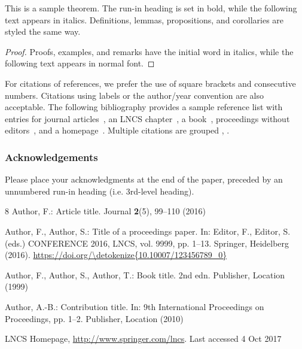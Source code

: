 \documentclass[runningheads]{llncs}
\def\doi#1{\href{https://doi.org/\detokenize{#1}}{\url{https://doi.org/\detokenize{#1}}}}
\begin{document}
\begin{theorem}
This is a sample theorem. The run-in heading is set in bold, while
the following text appears in italics. Definitions, lemmas,
propositions, and corollaries are styled the same way.
\end{theorem}
%
%
\begin{proof}
Proofs, examples, and remarks have the initial word in italics,
while the following text appears in normal font.
\end{proof}
For citations of references, we prefer the use of square brackets
and consecutive numbers. Citations using labels or the author/year
convention are also acceptable. The following bibliography provides
a sample reference list with entries for journal
articles~\cite{ref_article1}, an LNCS chapter~\cite{ref_lncs1}, a
book~\cite{ref_book1}, proceedings without editors~\cite{ref_proc1},
and a homepage~\cite{ref_url1}. Multiple citations are grouped
\cite{ref_article1,ref_lncs1,ref_book1},
\cite{ref_article1,ref_book1,ref_proc1,ref_url1}.

\subsubsection{Acknowledgements} Please place your acknowledgments at
the end of the paper, preceded by an unnumbered run-in heading (i.e.
3rd-level heading).


%
%
%
% 
% 
%
\begin{thebibliography}{8}
Author, F.: Article title. Journal \textbf{2}(5), 99--110 (2016)

Author, F., Author, S.: Title of a proceedings paper. In: Editor,
F., Editor, S. (eds.) CONFERENCE 2016, LNCS, vol. 9999, pp. 1--13.
Springer, Heidelberg (2016). \doi{10.10007/123456789_0}

Author, F., Author, S., Author, T.: Book title. 2nd edn. Publisher,
Location (1999)

Author, A.-B.: Contribution title. In: 9th International Proceedings
on Proceedings, pp. 1--2. Publisher, Location (2010)

LNCS Homepage, \url{http://www.springer.com/lncs}. Last accessed 4
Oct 2017
\end{thebibliography}
\end{document}
